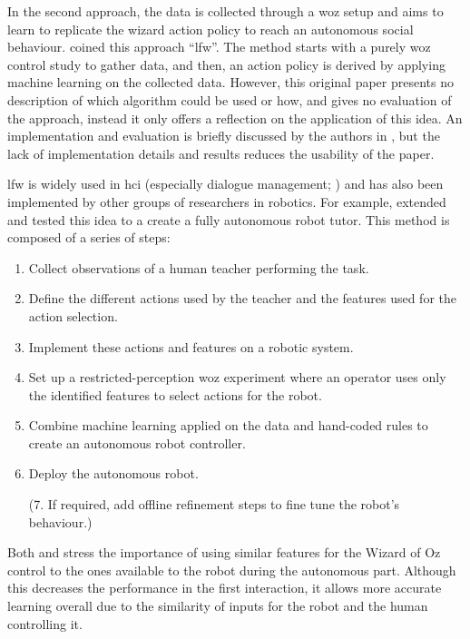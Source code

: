     In the second approach, the data is collected through a \gls{woz} setup and aims to learn to replicate the wizard action policy to reach an autonomous social behaviour. \cite{knox2014learning} coined this approach ``\gls{lfw}''. The method starts with a purely \gls{woz} control study to gather data, and then, an action policy is derived by applying machine learning on the collected data. However, this original paper presents no description of which algorithm could be used or how, and gives no evaluation of the approach, instead it only offers a reflection on the application of this idea. An implementation and evaluation is briefly discussed by the authors in \cite{knox2016learning}, but the lack of implementation details and results reduces the usability of the paper.
    
    \gls{lfw} is widely used in \gls{hci} (especially dialogue management; \citealt{rieser2008learning}) and has also been implemented by other groups of researchers in robotics. For example, \citet{sequeira2016discovering} extended and tested this idea to a create a fully autonomous robot tutor. This method is composed of a series of steps: 
    \begin{enumerate}
    	\item Collect observations of a human teacher performing the task.
    	\item Define the different actions used by the teacher and the features used for the action selection.
    	\item Implement these actions and features on a robotic system.
    	\item Set up a restricted-perception \gls{woz} experiment where an operator uses only the identified features to select actions for the robot.
    	\item Combine machine learning applied on the data and hand-coded rules to create an autonomous robot controller.
    	\item Deploy the autonomous robot.
    	\item[(7.] If required, add offline refinement steps to fine tune the robot's behaviour.)
    \end{enumerate}

    Both \citet{knox2014learning} and \citet{sequeira2016discovering} stress the importance of using similar features for the Wizard of Oz control to the ones available to the robot during the autonomous part. Although this decreases the performance in the first interaction, it allows more accurate learning overall due to the similarity of inputs for the robot and the human controlling it.
        
